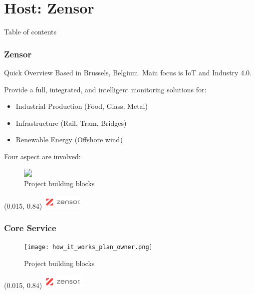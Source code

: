 \section{Host: Zensor}
\SectionPage
\begin{frame}{Table of contents}
    \tableofcontents[currentsection]
\end{frame}

\begin{frame}
    \frametitle{Zensor}

    \begin{alertblock}{Quick Overview}
        Based in Brussels, \alert{Belgium}. Main focus is \acs{IoT} and Industry 4.0.
    \end{alertblock}

    Provide a full, integrated, and intelligent monitoring solutions for:
    \begin{itemize}
        \item
        Industrial Production (Food, Glass, Metal)
        \item
        Infrastructure (Rail, Tram, Bridges)
        \item 
        Renewable Energy (Offshore wind)
    \end{itemize}

    \pause
    \medskip
    Four aspect are involved:
    \begin{figure}[ht]
        \centering
        \includegraphics<2>[width=\textwidth]{4_phases_building_blocks.png}
        \caption{Project building blocks}
        \label{fig:blocks}
    \end{figure}

    \begin{textblock}{1}(0.015, 0.84)
        \includegraphics[width = 2cm]{frames/logos/zensor_logo.png}
    \end{textblock}
\end{frame}

\begin{frame}
    \frametitle{Core Service}
    \begin{figure}[ht]
        \centering
        \texttt{[image: how\_it\_works\_plan\_owner.png]}
        \caption{Project building blocks}
        \label{fig:test_}
    \end{figure}

    \begin{textblock}{1}(0.015, 0.84)
        \includegraphics[width = 2cm]{frames/logos/zensor_logo.png}
    \end{textblock}
\end{frame}